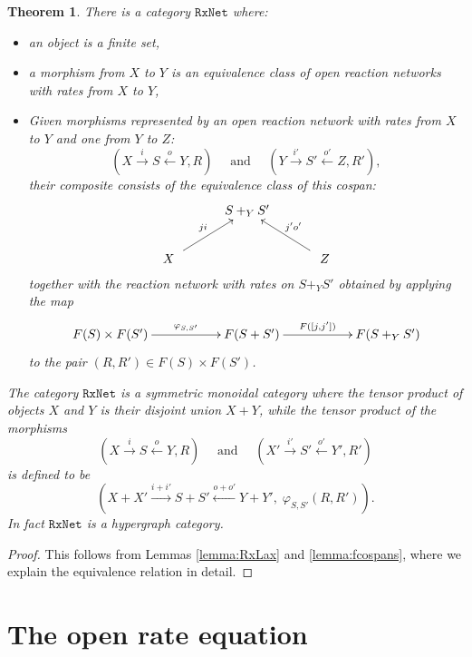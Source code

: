 \documentclass{compositionalityarticle}
\newcommand{\RxNet}{\mathtt{RxNet}}
\theoremstyle{plain}
\newtheorem{thm}{Theorem}
\theoremstyle{remark}
\begin{document}
\begin{thm}
\label{thm:RxNet}
There is a category $\RxNet$ where:
\begin{itemize}
\item an object is a finite set,
\item a morphism from $X$ to $Y$ is an equivalence class of open reaction networks 
with rates from $X$ to $Y$, 
\item Given morphisms represented by an open reaction network with rates from $X$ to $Y$ and one from $Y$ to $Z$:
 \[
    (X \stackrel{i}\longrightarrow S \stackrel{o}\longleftarrow Y, R) 
    \quad \textrm{ and } \quad
    (Y \stackrel{i'}\longrightarrow S' \stackrel{o'}\longleftarrow Z, R'), 
  \]
their composite consists of the equivalence class of this cospan:
  \[
    \xymatrix{
      & S +_Y S' \\
      \quad X\quad \ar[ur]^{ji} && \quad Z \quad \ar[ul]_{j'o'}
    }
  \]
together with the reaction network with rates on $S +_Y S'$ 
obtained by applying the map
\[      
\xymatrix{      F(S) \times F(S') \ar[rr]^-{\varphi_{S,S'}} && 
                     F(S + S') \ar[rr]^-{F([j,j'])} && F(S +_Y S') } \]
to the pair $(R,R') \in F(S) \times F(S')$.  
\end{itemize}
The category $\RxNet$ is a symmetric monoidal category where the tensor product of objects $X$ and $Y$ is their disjoint union $X + Y$, while the tensor product of the morphisms
\[
    (X \stackrel{i}{\longrightarrow} S \stackrel{o}{\longleftarrow} Y, R) 
    \quad \textrm{ and } \quad
    (X' \stackrel{i'}{\longrightarrow} S' \stackrel{o'}{\longleftarrow} Y', R') 
  \]
is defined to be
\[  ( X + X' \stackrel{i+i'}{\longrightarrow} S + S'  \stackrel{o + o'}{\longleftarrow} Y + Y', \; \varphi_{S,S'}(R,R') ) .\]
In fact $\RxNet$ is a hypergraph category.
\end{thm}

\begin{proof}
This follows from Lemmas \ref{lemma:RxLax} and \ref{lemma:fcospans}, 
where we explain the equivalence relation in detail.  
\end{proof}

\section{The open rate equation}
\label{sec:openrate}
\end{document}
